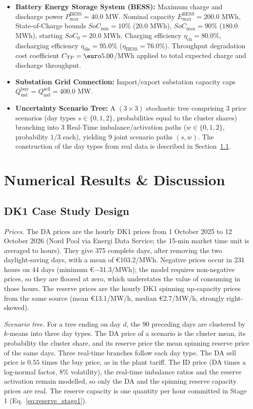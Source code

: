\documentclass[5p,times,twocolumn]{elsarticle}
\begin{document}
\begin{itemize}
    \item \textbf{Battery Energy Storage System (BESS):} Maximum charge and discharge power $P_{\text{max}}^{\text{BESS}} = 40.0$ MW. Nominal capacity $E_{\text{max}}^{\text{BESS}} = 200.0$ MWh, State-of-Charge bounds $SoC_{\text{min}} = 10\%$ ($20.0$ MWh), $SoC_{\text{max}} = 90\%$ ($180.0$ MWh), starting $SoC_0 = 20.0$ MWh. Charging efficiency $\eta_{\text{ch}} = 80.0\%$, discharging efficiency $\eta_{\text{dis}} = 95.0\%$ ($\eta_{\text{BESS}} = 76.0\%$). Throughput degradation cost coefficient $C_{\text{TP}} = \text{\euro}5.00$/MWh applied to total expected charge and discharge throughput.
    \item \textbf{Substation Grid Connection:} Import/export substation capacity caps $Q_{\text{md}}^{\text{buy}} = Q_{\text{md}}^{\text{sell}} = 400.0$ MW.
    \item \textbf{Uncertainty Scenario Tree:} A $(3 \times 3)$ stochastic tree comprising 3 price scenarios (day types $s \in \{0, 1, 2\}$, probabilities equal to the cluster shares) branching into 3 Real-Time imbalance/activation paths ($w \in \{0, 1, 2\}$, probability $1/3$ each), yielding 9 joint scenario paths $(s,w)$. The construction of the day types from real data is described in Section~\ref{sec:casestudy}.
\end{itemize}


\section{Numerical Results \& Discussion}
\label{sec:results}

\subsection{DK1 Case Study Design}
\label{sec:casestudy}
 \textit{Prices.} The DA prices are the hourly DK1 prices from 1 October 2025 to 12 October 2026 (Nord Pool via Energi Data Service; the 15-min market time unit is averaged to hours). They give 375 complete days, after removing the two daylight-saving days, with a mean of \euro 103.2/MWh. Negative prices occur in 231 hours on 44 days (minimum \euro $-$31.3/MWh); the model requires non-negative prices, so they are floored at zero, which understates the value of consuming in those hours. The reserve prices are the hourly DK1 spinning up-capacity prices from the same source (mean \euro 13.1/MW/h, median \euro 2.7/MW/h, strongly right-skewed).

\textit{Scenario tree.} For a tree ending on day $d$, the 90 preceding days are clustered by $k$-means into three day types. The DA price of a scenario is the cluster mean, its probability the cluster share, and its reserve price the mean spinning reserve price of the same days. Three real-time branches follow each day type. The DA sell price is $0.55$ times the buy price, as in the plant tariff. The ID price (DA times a log-normal factor, 8\% volatility), the real-time imbalance ratios and the reserve activation remain modelled, so only the DA and the spinning reserve capacity prices are real. The reserve capacity is one quantity per hour committed in Stage 1 (Eq.~\eqref{eq:reserve_stage1}).
\end{document}
